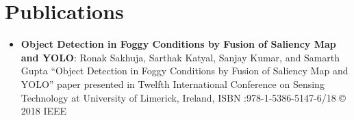 \documentclass[letterpaper,11pt]{article}
\newcommand{\resumeItem}[2]{
  \item\small{
    \textbf{#1}{: #2 \vspace{-2pt}}
  }
}
\newcommand{\resumeSubItem}[2]{\resumeItem{#1}{#2}\vspace{-6pt}}
\newcommand{\resumeSubHeadingListStart}{\begin{itemize}[leftmargin=*]}
\newcommand{\resumeSubHeadingListEnd}{\end{itemize}}
\begin{document}
\section{Publications}
    \resumeSubHeadingListStart
        \resumeSubItem
        {Object Detection in Foggy Conditions by Fusion of Saliency Map and YOLO}
        {Ronak Sakhuja, Sarthak Katyal, Sanjay Kumar, and Samarth Gupta “Object Detection in Foggy Conditions by  Fusion  of  Saliency  Map  and  YOLO”  paper  presented  in  Twelfth  International  Conference  on  Sensing Technology at University of Limerick, Ireland, ISBN :978-1-5386-5147-6/18 © 2018 IEEE }
    \resumeSubHeadingListEnd
\end{document}
